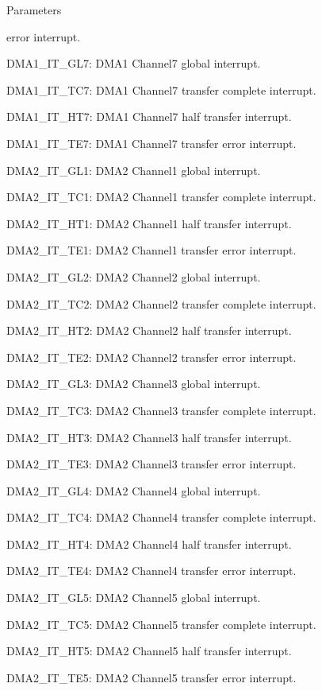 \begin{DoxyParams}{Parameters}
\begin{DoxyItemize}
error interrupt. \item D\+M\+A1\+\_\+\+I\+T\+\_\+\+G\+L7\+: D\+M\+A1 Channel7 global interrupt. \item D\+M\+A1\+\_\+\+I\+T\+\_\+\+T\+C7\+: D\+M\+A1 Channel7 transfer complete interrupt. \item D\+M\+A1\+\_\+\+I\+T\+\_\+\+H\+T7\+: D\+M\+A1 Channel7 half transfer interrupt. \item D\+M\+A1\+\_\+\+I\+T\+\_\+\+T\+E7\+: D\+M\+A1 Channel7 transfer error interrupt. \item D\+M\+A2\+\_\+\+I\+T\+\_\+\+G\+L1\+: D\+M\+A2 Channel1 global interrupt. \item D\+M\+A2\+\_\+\+I\+T\+\_\+\+T\+C1\+: D\+M\+A2 Channel1 transfer complete interrupt. \item D\+M\+A2\+\_\+\+I\+T\+\_\+\+H\+T1\+: D\+M\+A2 Channel1 half transfer interrupt. \item D\+M\+A2\+\_\+\+I\+T\+\_\+\+T\+E1\+: D\+M\+A2 Channel1 transfer error interrupt. \item D\+M\+A2\+\_\+\+I\+T\+\_\+\+G\+L2\+: D\+M\+A2 Channel2 global interrupt. \item D\+M\+A2\+\_\+\+I\+T\+\_\+\+T\+C2\+: D\+M\+A2 Channel2 transfer complete interrupt. \item D\+M\+A2\+\_\+\+I\+T\+\_\+\+H\+T2\+: D\+M\+A2 Channel2 half transfer interrupt. \item D\+M\+A2\+\_\+\+I\+T\+\_\+\+T\+E2\+: D\+M\+A2 Channel2 transfer error interrupt. \item D\+M\+A2\+\_\+\+I\+T\+\_\+\+G\+L3\+: D\+M\+A2 Channel3 global interrupt. \item D\+M\+A2\+\_\+\+I\+T\+\_\+\+T\+C3\+: D\+M\+A2 Channel3 transfer complete interrupt. \item D\+M\+A2\+\_\+\+I\+T\+\_\+\+H\+T3\+: D\+M\+A2 Channel3 half transfer interrupt. \item D\+M\+A2\+\_\+\+I\+T\+\_\+\+T\+E3\+: D\+M\+A2 Channel3 transfer error interrupt. \item D\+M\+A2\+\_\+\+I\+T\+\_\+\+G\+L4\+: D\+M\+A2 Channel4 global interrupt. \item D\+M\+A2\+\_\+\+I\+T\+\_\+\+T\+C4\+: D\+M\+A2 Channel4 transfer complete interrupt. \item D\+M\+A2\+\_\+\+I\+T\+\_\+\+H\+T4\+: D\+M\+A2 Channel4 half transfer interrupt. \item D\+M\+A2\+\_\+\+I\+T\+\_\+\+T\+E4\+: D\+M\+A2 Channel4 transfer error interrupt. \item D\+M\+A2\+\_\+\+I\+T\+\_\+\+G\+L5\+: D\+M\+A2 Channel5 global interrupt. \item D\+M\+A2\+\_\+\+I\+T\+\_\+\+T\+C5\+: D\+M\+A2 Channel5 transfer complete interrupt. \item D\+M\+A2\+\_\+\+I\+T\+\_\+\+H\+T5\+: D\+M\+A2 Channel5 half transfer interrupt. \item D\+M\+A2\+\_\+\+I\+T\+\_\+\+T\+E5\+: D\+M\+A2 Channel5 transfer error interrupt. \end{DoxyItemize}
\\
\hline
\end{DoxyParams}

